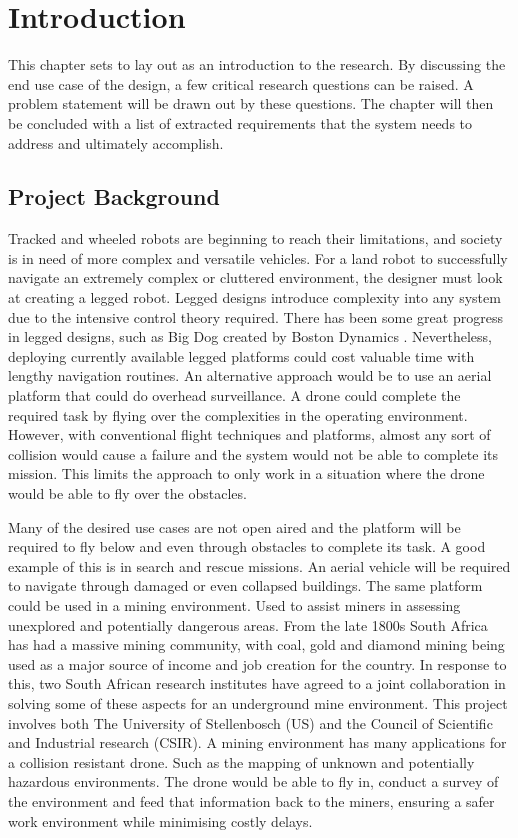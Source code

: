 \chapter{Introduction}
This chapter sets to lay out as an introduction to the research. By discussing the end use case of the design, a few critical research questions can be raised. A problem statement will be drawn out by these questions. The chapter will then be concluded with a list of extracted requirements that the system needs to address and ultimately accomplish.

	\section{Project Background}
	Tracked and wheeled robots are beginning to reach their limitations, and society is in need of more complex and versatile vehicles. For a land robot to successfully navigate an extremely complex or cluttered environment, the designer must look at creating a legged robot. Legged designs introduce complexity into any system due to the intensive control theory required. There has been some great progress in legged designs, such as Big Dog created by Boston Dynamics \cite{BigDog}. Nevertheless, deploying currently available legged platforms could cost valuable time with lengthy navigation routines. An alternative approach would be to use an aerial platform that could do overhead surveillance. A drone could complete the required task by flying over the complexities in the operating environment. However, with conventional flight techniques and platforms, almost any sort of collision would cause a failure and the system would not be able to complete its mission. This limits the approach to only work in a situation where the drone would be able to fly over the obstacles. 
	
	Many of the desired use cases are not open aired and the platform will be required to fly below and even through obstacles to complete its task. A good example of this is in search and rescue missions. An aerial vehicle will be required to navigate through damaged or even collapsed buildings. The same platform could be used in a mining environment. Used to assist miners in assessing unexplored and potentially dangerous areas. 
	From the late 1800s South Africa has had a massive mining community, with coal, gold and diamond mining being used as a major source of income and job creation for the country. In response to this, two South African research institutes have agreed to a joint collaboration in solving some of these aspects for an underground mine environment. This project involves both The University of Stellenbosch (US) and the Council of Scientific and Industrial research (CSIR). A mining environment has many applications for a collision resistant drone. Such as the mapping of unknown and potentially hazardous environments. The drone would be able to fly in, conduct a survey of the environment and feed that information back to the miners, ensuring a safer work environment while minimising costly delays.
	
